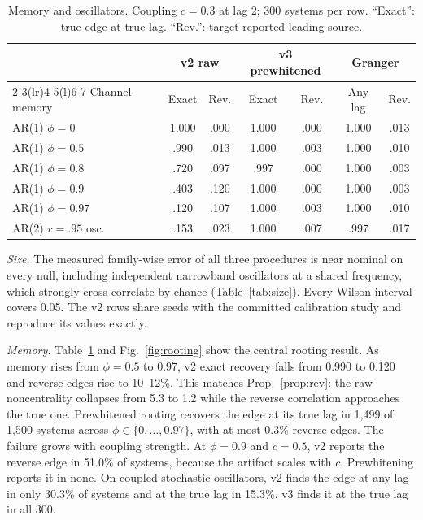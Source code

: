 \documentclass[10pt,twocolumn,letterpaper]{article}
\theoremstyle{definition}
\theoremstyle{remark}
\begin{document}
\begin{table}[t]
\centering\footnotesize
\caption{Memory and oscillators. Coupling $c=0.3$ at lag 2; 300 systems per
row. ``Exact'': true edge at true lag. ``Rev.'': target reported leading
source.}
\label{tab:memory}
\setlength{\tabcolsep}{3.5pt}
\begin{tabular}{@{}lcccccc@{}}
\toprule
 & \multicolumn{2}{c}{v2 raw} & \multicolumn{2}{c}{v3 prewhitened} & \multicolumn{2}{c}{Granger}\\
\cmidrule(lr){2-3}\cmidrule(lr){4-5}\cmidrule(l){6-7}
Channel memory & Exact & Rev. & Exact & Rev. & Any lag & Rev.\\
\midrule
AR(1) $\phi=0$ & 1.000 & .000 & 1.000 & .000 & 1.000 & .013\\
AR(1) $\phi=0.5$ & .990 & .013 & 1.000 & .003 & 1.000 & .010\\
AR(1) $\phi=0.8$ & .720 & .097 & .997 & .000 & 1.000 & .003\\
AR(1) $\phi=0.9$ & .403 & .120 & 1.000 & .000 & 1.000 & .003\\
AR(1) $\phi=0.97$ & .120 & .107 & 1.000 & .003 & 1.000 & .010\\
AR(2) $r=.95$ osc. & .153 & .023 & 1.000 & .007 & .997 & .017\\
\bottomrule
\end{tabular}
\end{table}

\textit{Size.} The measured family-wise error of all three procedures is near
nominal on every null, including independent narrowband oscillators at a shared frequency, which
strongly cross-correlate by chance (Table~\ref{tab:size}). Every Wilson interval
covers 0.05. The v2 rows share seeds with the committed calibration study and
reproduce its values exactly.

\textit{Memory.} Table~\ref{tab:memory} and Fig.~\ref{fig:rooting} show the
central rooting result. As memory rises from $\phi=0.5$ to 0.97, v2 exact
recovery falls from 0.990 to 0.120 and reverse edges rise to 10--12\%. This
matches Prop.~\ref{prop:rev}: the raw noncentrality collapses from 5.3 to 1.2
while the reverse correlation approaches the true one. Prewhitened rooting
recovers the edge at its true lag in 1,499 of 1,500 systems across
$\phi\in\{0,\dots,0.97\}$, with at most 0.3\% reverse edges. The failure grows
with coupling strength. At $\phi=0.9$ and $c=0.5$, v2 reports the reverse edge in
51.0\% of systems, because the artifact scales with $c$. Prewhitening reports
it in none. On coupled stochastic oscillators, v2 finds the edge at any lag in
only 30.3\% of systems and at the true lag in 15.3\%. v3 finds it at the true
lag in all 300.
\end{document}
